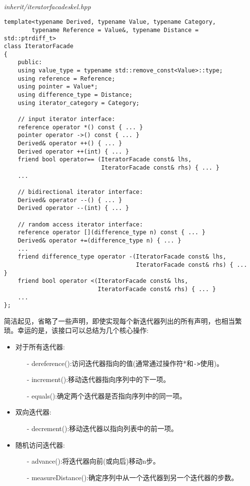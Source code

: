 \hspace*{\fill} \\ %
\noindent
\textit{inherit/iteratorfacadeskel.hpp}
\begin{lstlisting}[style=styleCXX]
template<typename Derived, typename Value, typename Category,
		typename Reference = Value&, typename Distance = std::ptrdiff_t>
class IteratorFacade
{
	public:
	using value_type = typename std::remove_const<Value>::type;
	using reference = Reference;
	using pointer = Value*;
	using difference_type = Distance;
	using iterator_category = Category;
	
	// input iterator interface:
	reference operator *() const { ... }
	pointer operator ->() const { ... }
	Derived& operator ++() { ... }
	Derived operator ++(int) { ... }
	friend bool operator== (IteratorFacade const& lhs,
						    IteratorFacade const& rhs) { ... }
	...
	
	// bidirectional iterator interface:
	Derived& operator --() { ... }
	Derived operator --(int) { ... }
	
	// random access iterator interface:
	reference operator [](difference_type n) const { ... }
	Derived& operator +=(difference_type n) { ... }
	...
	friend difference_type operator -(IteratorFacade const& lhs,
									  IteratorFacade const& rhs) { ... }
	friend bool operator <(IteratorFacade const& lhs,
						   IteratorFacade const& rhs) { ... }
	...
};
\end{lstlisting}

简洁起见，省略了一些声明，即使实现每个新迭代器列出的所有声明，也相当繁琐。幸运的是，该接口可以总结为几个核心操作:

\begin{itemize}
\item 
对于所有迭代器:
\begin{itemize}
\item [-]
dereference():访问迭代器指向的值(通常通过操作符*和\texttt{->}使用)。

\item [-]
increment():移动迭代器指向序列中的下一项。

\item [-]
equals():确定两个迭代器是否指向序列中的同一项。
\end{itemize}

\item 
双向迭代器:
\begin{itemize}
\item [-]
decrement():移动迭代器以指向列表中的前一项。
\end{itemize}

\item 
随机访问迭代器:
\begin{itemize}
\item [-]
advance():将迭代器向前(或向后)移动n步。

\item [-]
measureDistance():确定序列中从一个迭代器到另一个迭代器的步数。
\end{itemize}
\end{itemize}

